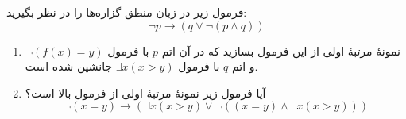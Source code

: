 فرمول زیر در زبان منطق گزاره‌ها را در نظر بگیرید:
\[\neg p \rightarrow (q \vee \neg(p \wedge q))\]
\begin{enumerate}[label=(\alph*)]
  \item نمونه‌ٔ مرتبهٔ اولی از این فرمول بسازید که در آن اتم $p$ با فرمول $\neg(f(x)=y)$ و اتم $q$ با فرمول $\exists x (x > y)$ جانشین شده است.
  \item آیا فرمول زیر نمونهٔ مرتبهٔ اولی از فرمول بالا است؟
  \[ \neg(x = y) \rightarrow (\exists x (x > y) \vee \neg((x = y) \wedge \exists x (x > y))) \]
\end{enumerate}